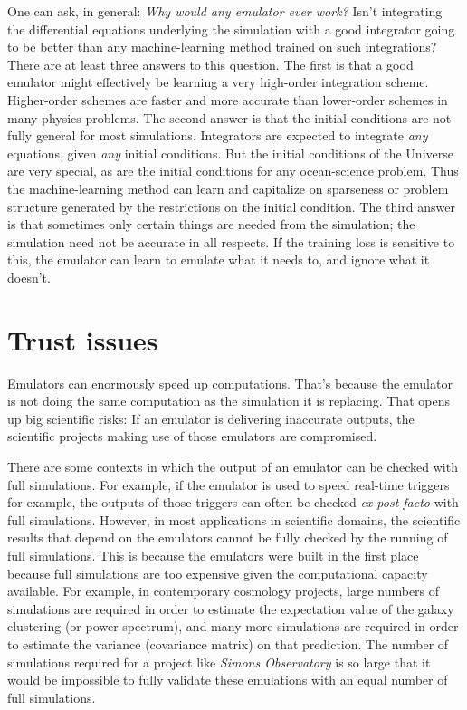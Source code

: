 \documentclass[11pt]{article}
\begin{document}
\smallskip
One can ask, in general: \emph{Why would any emulator ever work?}
Isn't integrating the differential equations underlying the simulation with a good integrator going to be better than any machine-learning method trained on such integrations?
There are at least three answers to this question.
The first is that a good emulator might effectively be learning a very high-order integration scheme.
Higher-order schemes are faster and more accurate than lower-order schemes in many physics problems.
The second answer is that the initial conditions are not fully general for most simulations.
Integrators are expected to integrate \emph{any} equations, given \emph{any} initial conditions.
But the initial conditions of the Universe are very special, as are the initial conditions for any ocean-science problem.
Thus the machine-learning method can learn and capitalize on sparseness or problem structure generated by the restrictions on the initial condition.
The third answer is that sometimes only certain things are needed from the simulation; the simulation need not be accurate in all respects.
If the training loss is sensitive to this, the emulator can learn to emulate what it needs to, and ignore what it doesn't.

\section{Trust issues}

Emulators can enormously speed up computations.
That's because the emulator is not doing the same computation as the simulation it is replacing.
That opens up big scientific risks:
If an emulator is delivering inaccurate outputs, the scientific projects making use of those emulators are compromised.

There are some contexts in which the output of an emulator can be checked with full simulations.
For example, if the emulator is used to speed real-time triggers for example, the outputs of those triggers can often be checked \textsl{ex post facto} with full simulations.
However, in most applications in scientific domains, the scientific results that depend on the emulators cannot be fully checked by the running of full simulations.
This is because the emulators were built in the first place because full simulations are too expensive given the computational capacity available.
For example, in contemporary cosmology projects, large numbers of simulations are required in order to estimate the expectation value of the galaxy clustering (or power spectrum), and many more simulations are required in order to estimate the variance (covariance matrix) on that prediction.
The number of simulations required for a project like \textsl{Simons Observatory} is so large that it would be impossible to fully validate these emulations with an equal number of full simulations.
\end{document}
